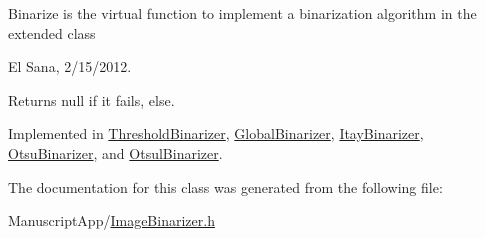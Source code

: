 Binarize is the virtual function to implement a binarization algorithm in the extended class 

El Sana, 2/15/2012. 

\begin{DoxyReturn}{Returns}
null if it fails, else. 
\end{DoxyReturn}


Implemented in \hyperlink{class_threshold_binarizer_a2880414f620b4a6f44032e478217ee1e}{Threshold\+Binarizer}, \hyperlink{class_global_binarizer_ad553b71737ff73e4ec06ccc52ba01b25}{Global\+Binarizer}, \hyperlink{class_itay_binarizer_ad0093e357fe07cc4b42dcc2f0f416832}{Itay\+Binarizer}, \hyperlink{class_otsu_binarizer_a4219a9f9e72d1d0eceee30402bf2afd5}{Otsu\+Binarizer}, and \hyperlink{class_otsul_binarizer_a14064c86e424c1e68625b7fbc07195d5}{Otsul\+Binarizer}.



The documentation for this class was generated from the following file\+:\begin{DoxyCompactItemize}
\item 
Manuscript\+App/\hyperlink{_image_binarizer_8h}{Image\+Binarizer.\+h}\end{DoxyCompactItemize}
